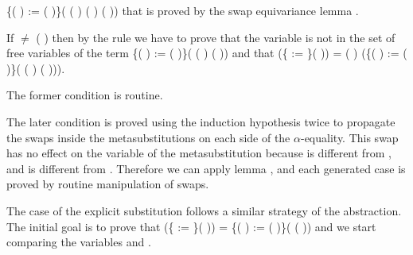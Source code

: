   \{(   ) := (   )\}( (   ) (   ) (   )) that is proved by the swap equivariance lemma .
\begin{coqdoccode}
\end{coqdoccode}
If  \ensuremath{\not=} (   ) then by the rule  we have to prove that the variable     is not in the set of free variables of the term \{(   ) := (   )\}( (   )  (   )) and that    (\{ := \}(   )) =
    (   ) (\{(   ) := (   )\}( (   )  (   ))).
\begin{coqdoccode}
\end{coqdoccode}
The former condition is routine.
\begin{coqdoccode}
\end{coqdoccode}
The later condition is proved using the induction hypothesis twice to propagate the swaps inside the metasubstitutions on each side of the $\alpha$-equality. This swap has no effect on the variable  of the metasubstitution because  is different from    , and  is different from . Therefore we can apply lemma , and each generated case is proved by routine manipulation of swaps.
\begin{coqdoccode}
\end{coqdoccode}
The case of the explicit substitution follows a similar strategy of the abstraction. The initial goal is to prove that    (\{ := \}(   )) = \{(   ) := (   )\}(   (   )) and we start comparing the variables  and .
